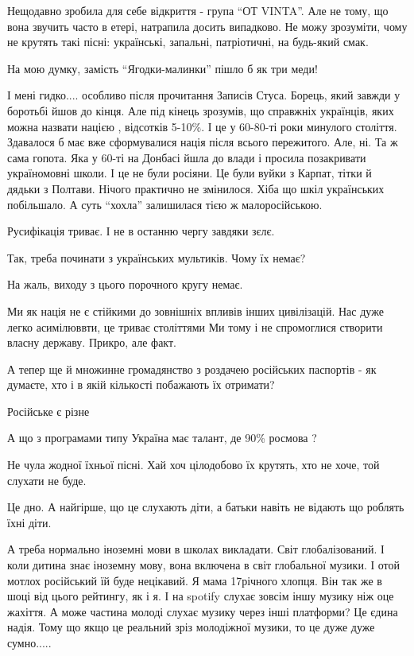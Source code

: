 \begin{itemize}

Нещодавно зробила для себе відкриття - група \enquote{ОТ VINTA}. Але не тому, що вона
звучить часто в етері, натрапила досить випадково. Не можу зрозуміти, чому не
крутять такі пісні: українські, запальні, патріотичні, на будь-який смак.

На мою думку, замість \enquote{Ягодки-малинки} пішло б як три меди!


І мені гидко.... особливо після прочитання Записів Стуса. Борець, який завжди у
боротьбі йшов до кінця. Але під кінець зрозумів, що справжніх українців, яких
можна назвати нацією , відсотків 5-10\%. І це у 60-80-ті роки минулого століття.
Здавалося б має вже сформувалися нація після всього пережитого. Але, ні. Та ж
сама гопота. Яка у 60-ті на Донбасі йшла до влади і просила позакривати
україномовні школи. І це не були росіяни. Це були вуйки з Карпат, тітки й
дядьки з Полтави. Нічого практично не змінилося. Хіба що шкіл українських
побільшало. А суть \enquote{хохла} залишилася тією ж малоросійською.

Русифікація триває. І не в останню чергу завдяки зєлє.

Так, треба починати з українських мультиків. Чому їх немає?


На жаль, виходу з цього порочного кругу немає.

Ми як нація не є стійкими до зовнішніх впливів інших цивілізацій. Нас дуже
легко асимілюввти, це триває століттями Ми тому і не спромоглися створити
власну державу. Прикро, але факт.

А тепер ще й множинне громадянство з роздачею російських паспортів - як
думаєте, хто і в якій кількості побажають їх отримати?

Російське є різне

А що з програмами типу Україна має талант, де 90\% росмова ?

Не чула жодної їхньої пісні. Хай хоч цілодобово їх крутять, хто не хоче, той слухати не буде.

Це дно. А найгірше, що це слухають діти, а батьки навіть не відають що роблять їхні діти.


А треба нормально іноземні мови в школах викладати. Світ глобалізований. І коли
дитина знає іноземну мову, вона включена в світ глобальної музики. І отой
мотлох російський їй буде нецікавий. Я мама 17річного хлопця. Він так же в шоці
від цього рейтингу, як і я. І на spotify слухає зовсім іншу музику ніж оце
жахіття. А може частина молоді слухає музику через інші платформи? Це єдина
надія. Тому що якщо це реальний зріз молодіжної музики, то це дуже дуже
сумно.....



\end{itemize}
